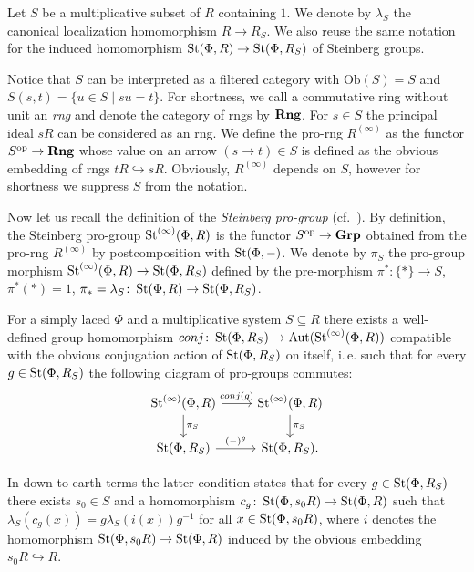 \documentclass[oneside, 11pt]{amsart} \pdfoutput=1
\begin{document}
Let $S$ be a multiplicative subset of $R$ containing $1$. 
We denote by $\lambda_S$ the canonical localization homomorphism $R \to R_S$.
We also reuse the same notation for the induced homomorphism $\mathop{\mathrm{St}}\nolimits(\Phi, R) \to \mathop{\mathrm{St}}\nolimits(\Phi, R_S)$ of Steinberg groups.

Notice that $S$ can be interpreted as a filtered category with $\mathrm{Ob}(S) = S$ and $S(s, t) = \{ u \in S \mid su = t \}$.
For shortness, we call a commutative ring without unit an {\it rng} and denote the category of rngs by ${\normalfont\textbf{Rng}}$.
For $s\in S$ the principal ideal $sR$ can be considered as an rng. We define the pro-rng $R^{(\infty)}$ as the functor $S^\mathrm{op} \to {\normalfont\textbf{Rng}}$ whose value on an arrow $(s \to t)\in S$ is defined as the obvious embedding of rngs $tR \hookrightarrow sR$. Obviously, $R^{(\infty)}$ depends on $S$, however for shortness we suppress $S$ from the notation.

Now let us recall the definition of the {\it Steinberg pro-group} (cf.~\cite[\S~2.4]{LSV20}). 
By definition, the Steinberg pro-group $\mathop{\mathrm{St}}\nolimits^{(\infty)}(\Phi, R)$ is the functor $S^\mathrm{op} \to {\normalfont\textbf{Grp}}$ obtained from the pro-rng $R^{(\infty)}$ by postcomposition with $\mathop{\mathrm{St}}\nolimits(\Phi, -)$.
We denote by $\pi_S$ the pro-group morphism $\mathop{\mathrm{St}}\nolimits^{(\infty)}(\Phi, R) \to \mathop{\mathrm{St}}\nolimits(\Phi, R_S)$ defined by the pre-morphism $\pi^* \colon \{* \} \to S$, $\pi^*(*) = 1$, $\pi_{*} = \lambda_S \colon \mathop{\mathrm{St}}\nolimits(\Phi, R) \to \mathop{\mathrm{St}}\nolimits(\Phi, R_S)$. 

\begin{prop}\label{prop:conj-action}
 For a simply laced $\Phi$ and a multiplicative system $S\subseteq R$ there exists a well-defined group homomorphism $conj\colon \mathop{\mathrm{St}}\nolimits(\Phi, R_S) \to \mathrm{Aut}(\mathop{\mathrm{St}}\nolimits^{(\infty)}(\Phi, R))$ compatible with the obvious conjugation action of $\mathop{\mathrm{St}}\nolimits(\Phi, R_S)$ on itself, i.\,e. such that for every $g \in \mathop{\mathrm{St}}\nolimits(\Phi, R_S)$ the following diagram of pro-groups commutes:
 \[ \begin{tikzcd} \St^{(\infty)}(\Phi, R) \ar{r}{conj(g)} \ar{d}{\pi_S} & \St^{(\infty)}(\Phi, R) \ar{d}{\pi_S} \\ \St(\Phi, R_S) \ar{r}{(-)^g} & \St(\Phi, R_S). \end{tikzcd} \]
\end{prop}
In down-to-earth terms the latter condition states that for every $g\in \mathop{\mathrm{St}}\nolimits(\Phi, R_S)$ there exists $s_0 \in S$ and a homomorphism $c_g\colon \mathop{\mathrm{St}}\nolimits(\Phi, s_0 R) \to \mathop{\mathrm{St}}\nolimits(\Phi, R)$ such that $\lambda_S(c_g(x)) = g\lambda_S(i(x))g^{-1}$ for all $x\in \mathop{\mathrm{St}}\nolimits(\Phi, s_0 R)$, where $i$ denotes the homomorphism $\mathop{\mathrm{St}}\nolimits(\Phi, s_0 R) \to \mathop{\mathrm{St}}\nolimits(\Phi, R)$ induced by the obvious embedding $s_0R \hookrightarrow R$.
\end{document}
